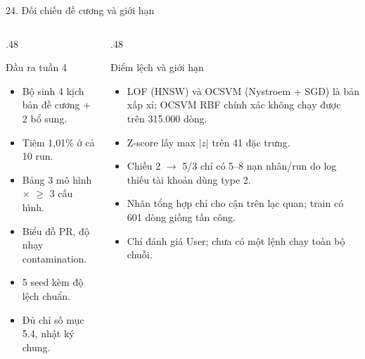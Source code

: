 \documentclass[aspectratio=169, 10pt]{beamer}
\begin{document}
\begin{frame}{24. Đối chiếu đề cương và giới hạn}
\begin{columns}[T,onlytextwidth]
\begin{column}{.48\textwidth}
\begin{block}{Đầu ra tuần 4}
\begin{itemize}\setlength\itemsep{4pt}\small
\item[\color{socgreen}\checkmark] Bộ sinh 4 kịch bản đề cương + 2 bổ sung.
\item[\color{socgreen}\checkmark] Tiêm 1,01\% ở cả 10 run.
\item[\color{socgreen}\checkmark] Bảng 3 mô hình $\times$ $\geq$ 3 cấu hình.
\item[\color{socgreen}\checkmark] Biểu đồ PR, độ nhạy contamination.
\item[\color{socgreen}\checkmark] 5 seed kèm độ lệch chuẩn.
\item[\color{socgreen}\checkmark] Đủ chỉ số mục 5.4, nhật ký chung.
\end{itemize}
\end{block}
\end{column}
\begin{column}{.48\textwidth}
\begin{exampleblock}{Điểm lệch và giới hạn}
\begin{itemize}\setlength\itemsep{3pt}\scriptsize
\item LOF (HNSW) và OCSVM (Nystroem + SGD) là bản xấp xỉ; OCSVM RBF chính xác không chạy được trên 315.000 dòng.
\item Z-score lấy max $|z|$ trên 41 đặc trưng.
\item Chiều 2 $\rightarrow$ 5/3 chỉ có 5--8 nạn nhân/run do log thiếu tài khoản dùng type 2.
\item Nhãn tổng hợp chỉ cho cận trên lạc quan; train có 601 dòng giống tấn công.
\item Chỉ đánh giá User; chưa có một lệnh chạy toàn bộ chuỗi.
\end{itemize}
\end{exampleblock}
\end{column}
\end{columns}
\end{frame}
\end{document}
